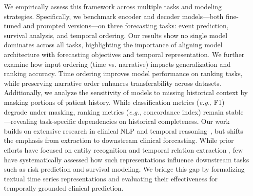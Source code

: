 We empirically assess this framework across multiple tasks and modeling strategies. Specifically, we benchmark encoder and decoder models---both fine-tuned and prompted versions---on three forecasting tasks: event prediction, survival analysis, and temporal ordering. Our results show no single model dominates across all tasks, highlighting the importance of aligning model architecture with forecasting objectives and temporal representation.
We further examine how input ordering (time vs. narrative) impacts generalization and ranking accuracy.
Time ordering improves model performance on ranking tasks, while preserving narrative order enhances transferability across datasets.
Additionally, we analyze the sensitivity of models to missing historical context by masking portions of patient history. While classification metrics (\emph{e.g.}, F1) degrade under masking, ranking metrics (\emph{e.g.}, concordance index) remain stable—revealing task-specific dependencies on historical completeness. 
Our work builds on extensive research in clinical NLP and temporal reasoning~\citep{kohane1987temporal, leeuwenberg2020towards, cheng2023typed}, but shifts the emphasis from extraction to downstream clinical forecasting. 
While prior efforts have focused on entity recognition and temporal relation extraction \citep{zhou2007temporal, uzuner20112010, sun2013evaluating}, few have systematically assessed how such representations influence downstream tasks such as risk prediction and survival modeling. 
We bridge this gap by formalizing textual time series representations and evaluating their effectiveness for temporally grounded clinical prediction.

